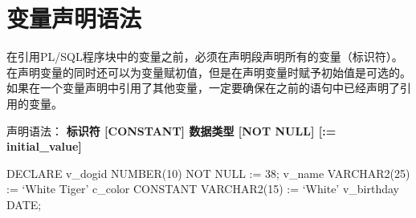 \documentclass[11pt, a4paper, oneside, UTF8]{ctexbook}
\let\kaishu\relax %
\begin{document}
\section{变量声明语法}
在引用PL/SQL程序块中的变量之前，必须在声明段声明所有的变量（标识符）。
在声明变量的同时还可以为变量赋初值，但是在声明变量时赋予初始值是可选的。
如果在一个变量声明中引用了其他变量，一定要确保在之前的语句中已经声明了引用的变量。

声明语法：
{\bfseries\kaishu 标识符 [CONSTANT] 数据类型 [NOT NULL] [:= initial\_value]}

\begin{plsql}[caption=PL/SQL变量声明语法示例]
  DECLARE
  v_dogid NUMBER(10) NOT NULL := 38;
  v_name VARCHAR2(25) := ‘White Tiger’
  c_color CONSTANT VARCHAR2(15) := ‘White’
  v_birthday DATE;
\end{plsql}
\end{document}
